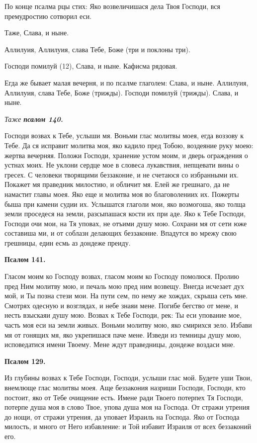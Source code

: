 По конце псалма рцы стих: Яко возвеличишася дела Твоя Господи, вся премудростию сотворил еси. 

Таже, Слава, и ныне.

Аллилуия, Аллилуия, слава Тебе, Боже (три и поклоны три).

Господи помилуй (12), Слава, и ныне. Кафисма рядовая.

Егда же бывает малая вечерня, и по псалме глаголем: Слава, и ныне. Аллилуия, Аллилуия, слава Тебе, Боже (трижды). Господи помилуй (трижды). Слава, и ныне.


\medskip


\itshape Таже \normalfont{}\bfseries псалом 140.\normalfont{}


Господи возвах к Тебе, услыши мя. Воньми глас молитвы моея, егда воззову к Тебе. Да ся исправит молитва моя, яко кадило пред Тобою, воздеяние руку моею: жертва вечерняя. Положи Господи, хранение устом моим, и дверь ограждения о устнах моих. Не уклони сердце мое в словеса лукавствия, непщевати вины о гресех. С человеки творящими беззаконие, и не счетаюся со избранными их. Покажет мя праведник милостию, и обличит мя. Елей же грешнаго, да не намастит главы моея. Яко еще и молитва моя во благоволениих их. Пожерты быша при камени судии их. Услышатся глаголи мои, яко возмогоша, яко толща земли проседеся на земли, разсыпашася кости их при аде. Яко к Тебе Господи, Господи очи мои, на Тя уповах, не отъими душу мою. Сохрани мя от сети юже составиша ми, и от соблазн делающих беззаконие. Впадутся во мрежу свою грешницы, един есмь аз дондеже преиду.


\medskip


\bfseries Псалом 141.\normalfont{}\nopagebreak


Гласом моим ко Господу возвах, гласом моим ко Господу помолюся. Пролию пред Ним молитву мою, и печаль мою пред ним возвещу. Внегда исчезает дух мой, и Ты позна стези мои. На пути сем, по нему же хождах, скрыша сеть мне. Смотрях одесную и возглядах, и небе знаяи мене. Погибе бегство от мене, и несть взыскаяи душу мою. Возвах к Тебе Господи, рек: Ты еси упование мое, часть моя еси на земли живых. Воньми молитву мою, яко смирихся зело. Избави мя от гонящих мя, яко укрепишася паче мене. Изведи из темницы душу мою, исповедатися имени Твоему. Мене ждут праведницы, дондеже воздаси мне.


\medskip


\bfseries Псалом 129.\normalfont{}\nopagebreak


Из глубины возвах к Тебе Господи, Господи, услыши глас мой. Будете уши Твои, внемлюще глас молитвы моея. Аще беззакония назриши Господи, Господи, кто постоит, яко от Тебе очищение есть. Имене ради Твоего потерпех Тя Господи, потерпе душа моя в слово Твое, упова душа моя на Господа. От стражи утрения до нощи, от стражи утрения, да уповает Израиль на Господа. Яко от Господа милость, и много от Него избавление: и Той избавит Израиля от всех беззаконий его.



